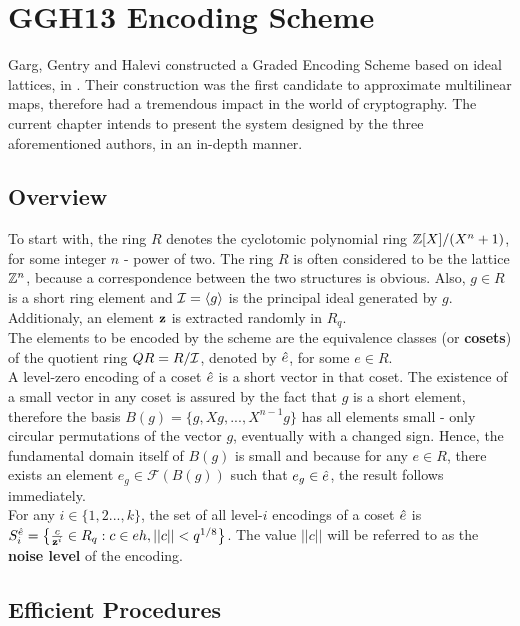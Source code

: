 \chapter{GGH13 Encoding Scheme}

Garg, Gentry and Halevi constructed a Graded Encoding Scheme based on ideal lattices, in \cite{GGH13}. Their construction was the first candidate to approximate multilinear maps, therefore had a tremendous impact in the world of cryptography. The current chapter intends to present the system designed by the three aforementioned authors, in an in-depth manner. 

\section{Overview}

To start with, the ring $R$ denotes the cyclotomic polynomial ring ${\mathbb Z}[X]/(X^n +1)$, for some integer $n$ - power of two. The ring $R$ is often considered to be the lattice ${\mathbb Z}^n$, because a correspondence between the two structures is obvious. Also, $g \in R$ is a short ring element and $\mathcal{I} = \langle g \rangle$ is the principal ideal generated by $g$. Additionaly, an element $\textbf{z}$ is extracted randomly in $R_q$. \\

The elements to be encoded by the scheme are the equivalence classes (or \textbf{cosets}) of the quotient ring $QR = R / \mathcal{I}$, denoted by $\hat{e}$, for some $e \in R$. \\

A level-zero encoding of a coset $\hat{e}$ is a short vector in that coset. The existence of a small vector in any coset is assured by the fact that $g$ is a short element, therefore the basis $B(g) = \{g, Xg,...,X^{n-1}g\}$ has all elements small - only circular permutations of the vector $g$, eventually with a changed sign. Hence, the fundamental domain itself of $B(g)$ is small and because for any $e \in R$, there exists an element $e_g \in \mathcal{F}(B(g))$ such that $e_g \in \hat{e}$, the result follows immediately.\\

For any $i \in \{1,2...,k\}$, the set of all level-$i$ encodings of a coset $\hat{e}$ is $S_i^{\hat{e}} = \big\{ \frac{c}{\textbf{z}^i}\in R_q : c \in eh, ||c|| < q^{1/8}\big\}$. The value $||c||$ will be referred to as the \textbf{noise level} of the encoding.\\

\section{Efficient Procedures}

